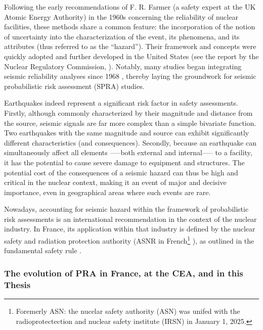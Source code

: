 Following the early recommendations of F. R. Farmer (a safety expert at the UK Atomic Energy Authority) in the 1960s concerning the reliability of nuclear facilities, these methods share a common feature: the incorporation of the notion of uncertainty into the characterization of the event, its phenomena, and its attributes (thus referred to as the ``hazard''). Their framework and concepts were quickly adopted and further developed in the United States (see the report by the Nuclear Regulatory Commission, \cite{nrc_pra_1983}). Notably, many studies began integrating seismic reliability analyses since 1968 \citep{cornell_engineering_1968}, thereby laying the groundwork for seismic probabilistic risk assessment (SPRA) studies.



Earthquakes indeed represent a significant risk factor in safety assessments. Firstly, although commonly characterized by their magnitude and distance from the source, seismic signals are far more complex than a simple bivariate function. Two earthquakes with the same magnitude and source can exhibit significantly different characteristics (and consequences). Secondly, because an earthquake can simultaneously affect all elements —--both external and internal—-- to a facility, it has the potential to cause severe damage to equipment and structures. The potential cost of the consequences of a seismic hazard can thus be high and critical in the nuclear context, making it an event of major and decisive importance, even in geographical areas where such events are rare.


Nowadays, accounting for seismic hazard within the framework of probabilistic risk assessments is an international recommendation in the context of the nuclear industry. In France, its application within that industry is defined by the nuclear safety and radiation protection authority (ASNR in French\footnote{Foremerly ASN: the nucelar safety authority (ASN) was unifed with the radioprotectection and nuclear safety institute (IRSN) in January 1, 2025.} ), as outlined in the fundamental safety rule \citep{asn_regle_2002}.



\subsubsection{The evolution of PRA in France, at the CEA, and in this Thesis}

